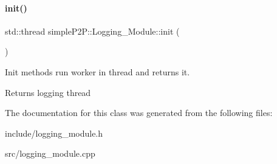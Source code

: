 \paragraph{\texorpdfstring{init()}{init()}}
{\footnotesize\ttfamily std\+::thread simple\+P2\+P\+::\+Logging\+\_\+\+Module\+::init (\begin{DoxyParamCaption}{ }\end{DoxyParamCaption})}



Init methods run worker in thread and returns it. 

\begin{DoxyReturn}{Returns}
logging thread 
\end{DoxyReturn}


The documentation for this class was generated from the following files\+:\begin{DoxyCompactItemize}
\item 
include/logging\+\_\+module.\+h\item 
src/logging\+\_\+module.\+cpp\end{DoxyCompactItemize}
